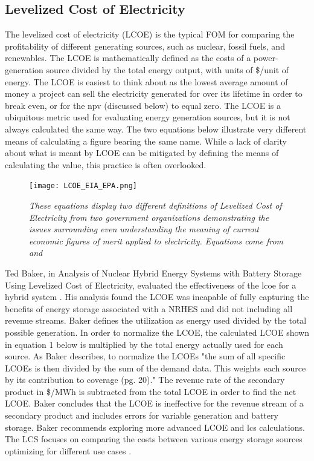 \documentclass[12pt]{UIdahoMastersThesis}
\begin{document}
\subsection{Levelized Cost of Electricity}
The levelized cost of electricity (LCOE) is the typical FOM for comparing the profitability of different generating sources, such as nuclear, fossil fuels, and renewables. The LCOE is mathematically defined as the costs of a power-generation source divided by the total energy output, with units of \$/unit of energy. The LCOE is easiest to think about as the lowest average amount of money a project can sell the electricity generated for over its lifetime in order to break even, or for the \ac{npv} (discussed below) to equal zero. The LCOE is a ubiquitous metric used for evaluating energy generation sources, but it is not always calculated the same way.  The two equations below illustrate very different means of calculating a figure bearing the same name.  While a lack of clarity about what is meant by LCOE can be mitigated by defining the means of calculating the value, this practice is often overlooked.

\begin{figure}[h!]
\texttt{[image: LCOE\_EIA\_EPA.png]}
\caption{\small \sl These equations display two different definitions of Levelized Cost of Electricity from two government organizations demonstrating the issues surrounding even understanding the meaning of current economic figures of merit applied to electricity.  Equations come from \cite{Eia2017} and }
\end{figure}


Ted Baker, in Analysis of Nuclear Hybrid Energy Systems with Battery Storage Using Levelized Cost of Electricity, evaluated the effectiveness of the \ac{lcoe} for a hybrid system \cite{Baker2016}. His analysis found the LCOE was incapable of fully capturing the benefits of energy storage associated with a NRHES and did not including all revenue streams.  Baker defines the utilization as energy used divided by the total possible generation. In order to normalize the LCOE, the calculated LCOE shown in equation 1 below is multiplied by the total energy actually used for each source.  As Baker describes, to normalize the LCOEs "the sum of all specific LCOEs is then divided by the sum of the demand data. This weights each source by its contribution to coverage (pg. 20)."  The revenue rate of the secondary product in \$/MWh is subtracted from the total LCOE in order to find the net LCOE.  Baker concludes that the LCOE is ineffective for the revenue stream of a secondary product and includes errors for variable generation and battery storage. Baker recommends exploring more advanced LCOE and \ac{lcs} calculations. The LCS focuses on comparing the costs between various energy storage sources optimizing for different use cases \cite{Tyskiewiczd}.
\end{document}
